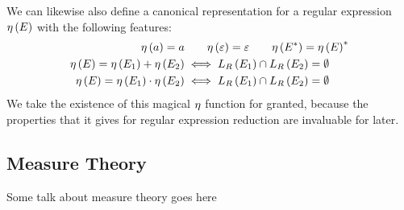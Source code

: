 We can likewise also define a canonical representation for a
regular expression \(\eta\left(E\right)\) with the following features:
\begin{align*}
  \eta\left(a\right) = a
    &\qquad \eta\left(\varepsilon\right) = \varepsilon
    \qquad \eta\left(E^\ast\right) = \eta\left(E\right)^\ast \\
  \eta\left(E\right)
      = \eta\left(E_1\right) + \eta\left(E_2\right)
    &\iff L_{R}\left(E_1\right) \cap L_{R}\left(E_2\right)
      = \emptyset \\
  \eta\left(E\right)
      = \eta\left(E_1\right) \cdot \eta\left(E_2\right)
    &\iff L_{R}\left(E_1\right) \cap L_{R}\left(E_2\right) = \emptyset
\end{align*}
We take the existence of this magical \(\eta\) function for granted,
because the properties that it gives for regular expression
reduction are invaluable for later.

\subsection{Measure Theory}
Some talk about measure theory goes here


